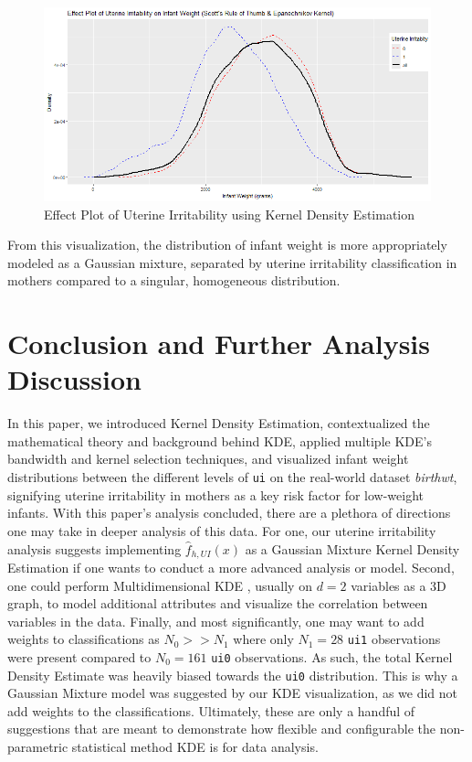 \documentclass{article}
\begin{document}
\begin{figure}[h]
    \centering
    \includegraphics[scale = 0.4]{volume/KDE_UIPlot.png}
    \caption{Effect Plot of Uterine Irritability using Kernel Density Estimation}
    \label{fig:effect-plot-KDE}
\end{figure}

From this visualization, the distribution of infant weight is more appropriately modeled as a Gaussian mixture, separated by uterine irritability classification in mothers compared to a singular, homogeneous distribution.


\section{Conclusion and Further Analysis Discussion}

In this paper, we introduced Kernel Density Estimation, contextualized the mathematical theory and background behind KDE, applied multiple KDE's bandwidth and kernel selection techniques, and visualized infant weight distributions between the different levels of \texttt{ui} on the real-world dataset \textit{birthwt}, signifying uterine irritability in mothers as a key risk factor for low-weight infants. With this paper's analysis concluded, there are a plethora of directions one may take in deeper analysis of this data. For one, our uterine irritability analysis suggests implementing $\hat f_{h, UI}(x)$ as a Gaussian Mixture Kernel Density Estimation \cite{gmmKDE} if one wants to conduct a more advanced analysis or model. Second, one could perform Multidimensional KDE \cite{masS}, usually on $d = 2$ variables as a 3D graph, to model additional attributes and visualize the correlation between variables in the data. Finally, and most significantly, one may want to add weights to classifications as $N_0 >> N_1$ where only $N_1 = 28$ \texttt{ui1} observations were present compared to $N_0 = 161$ \texttt{ui0} observations. As such, the total Kernel Density Estimate was heavily biased towards the \texttt{ui0} distribution. This is why a Gaussian Mixture model was suggested by our KDE visualization, as we did not add weights to the classifications. Ultimately, these are only a handful of suggestions that are meant to demonstrate how flexible and configurable the non-parametric statistical method KDE is for data analysis.




\end{document}
